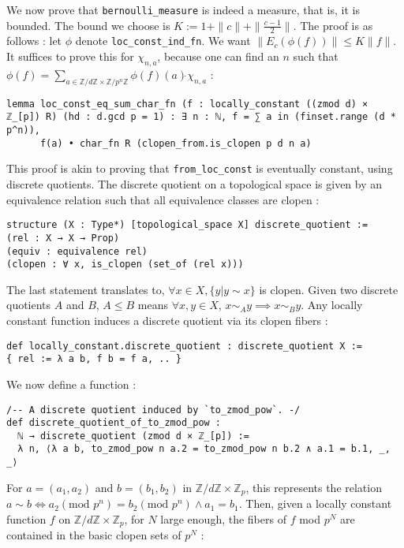 \documentclass[a4paper,UKenglish,cleveref, autoref, thm-restate]{lipics-v2021}
\newcommand{\lean}[1]{\texttt{#1}\xspace} %
\begin{document}
We now prove that \lean{bernoulli\_measure} is indeed a measure, that is, it is bounded. The bound we choose is 
$K := 1 + \parallel c \parallel + \parallel \frac{c - 1}{2} \parallel$. The proof is as follows : let $\phi$ denote \lean{loc\_const\_ind\_fn}. 
We want $ \parallel E_c (\phi (f)) \parallel \le K \parallel f \parallel $. It suffices to prove this for $\chi_{n, a}$, because one can find an $n$ such that 
$\phi (f) = \sum_{a \in \mathbb{Z}/d \mathbb{Z} \times \mathbb{Z} /p^n \mathbb{Z}} \phi(f) (a) \dot{} \chi_{n,a}$ :
\begin{lstlisting}
lemma loc_const_eq_sum_char_fn (f : locally_constant ((zmod d) × ℤ_[p]) R) (hd : d.gcd p = 1) : ∃ n : ℕ, f = ∑ a in (finset.range (d * p^n)), 
      f(a) • char_fn R (clopen_from.is_clopen p d n a)
\end{lstlisting}
This proof is akin to proving that \lean{from\_loc\_const} is eventually constant, using discrete quotients. 
The discrete quotient on a topological space is given by an equivalence relation such 
that all equivalence classes are clopen : 
\begin{lstlisting}
structure (X : Type*) [topological_space X] discrete_quotient :=
(rel : X → X → Prop) 
(equiv : equivalence rel) 
(clopen : ∀ x, is_clopen (set_of (rel x)))
\end{lstlisting}
The last statement translates to, $\forall x \in X, \{ y | y \sim x \}$ is clopen. 
Given two discrete quotients $A$ and $B$, $A \le B$ means $\forall x,y \in X$, 
$x \sim_{A} y \implies x \sim_{B} y$. Any locally constant function induces a 
discrete quotient via its clopen fibers : 
\begin{lstlisting}
def locally_constant.discrete_quotient : discrete_quotient X := 
{ rel := λ a b, f b = f a, .. }
\end{lstlisting}
We now define a function : 
\begin{lstlisting}
/-- A discrete quotient induced by `to_zmod_pow`. -/
def discrete_quotient_of_to_zmod_pow : 
  ℕ → discrete_quotient (zmod d × ℤ_[p]) := 
  λ n, ⟨λ a b, to_zmod_pow n a.2 = to_zmod_pow n b.2 ∧ a.1 = b.1, _, _⟩
\end{lstlisting}
For $a = (a_1, a_2)$ and $b = (b_1, b_2)$ in $\mathbb{Z}/d \mathbb{Z} \times \mathbb{Z}_p$, this represents the relation 
$ a \sim b \iff a_2 (\text{mod } p^n) = b_2 (\text{mod } p^n) \wedge a_1 = b_1 $. 
Then, given a locally constant function $f$ on $\mathbb{Z}/d \mathbb{Z} \times \mathbb{Z}_p$, for $N$ large enough, the fibers of $f$ mod $p^N$ are contained in the basic clopen sets of $p^N$ :
\end{document}
